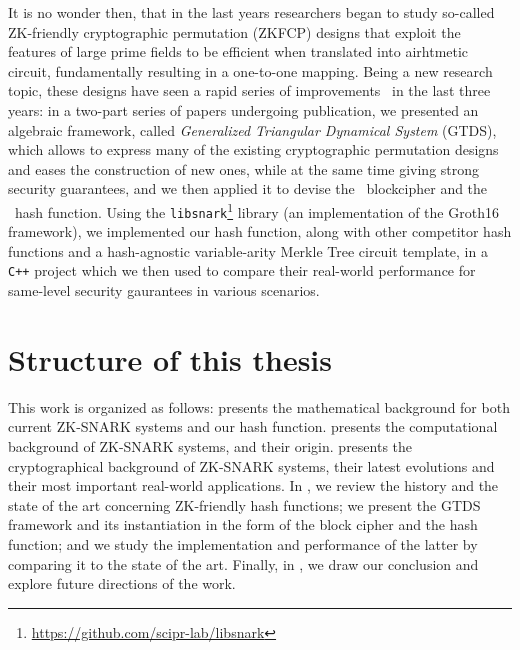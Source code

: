 It is no wonder then, that in the last years researchers began to study so-called ZK-friendly 
cryptographic permutation (ZKFCP) designs that exploit the features of large prime fields to be 
efficient when translated into airhtmetic circuit, fundamentally resulting in a one-to-one mapping.
Being a new research topic, these designs have seen a rapid series of 
improvements~\cite{AlbrechtGRRT2016,GrassiKRRS2021,GrassiHRSWW2022} in the last three years:
in a two-part series of papers undergoing publication, we presented an algebraic 
framework, called \emph{Generalized Triangular Dynamical System} (GTDS), which allows to express
many of the existing cryptographic permutation designs and eases the construction of new ones, while
at the same time giving strong security guarantees, and we then applied it to devise the \Blocc\ 
blockcipher and the \Stamp\ hash function.
Using the \texttt{libsnark}\footnote{\url{https://github.com/scipr-lab/libsnark}} library (an 
implementation of the Groth16 framework), we implemented our hash function, along with other 
competitor hash functions and a hash-agnostic variable-arity Merkle Tree circuit template, in a 
\texttt{C++} project which we then used to compare their real-world performance for same-level 
security gaurantees in various scenarios.

\section*{Structure of this thesis}
This work is organized as follows:  presents the mathematical background for 
both current ZK-SNARK systems and our hash function.
 presents the computational background of ZK-SNARK systems, and their origin.
\Cref{chap:crypto} presents the cryptographical background of ZK-SNARK systems, their latest 
evolutions and their most important real-world applications.
In , we review the history and the state of the art concerning ZK-friendly hash 
functions; we present the GTDS framework and its instantiation in the form of the \Arion{} block 
cipher and the \ArionHash{} hash function; and we study the implementation and performance 
of the latter by comparing it to the state of the art. 
Finally, in , we draw our conclusion and explore future directions of the 
work.
